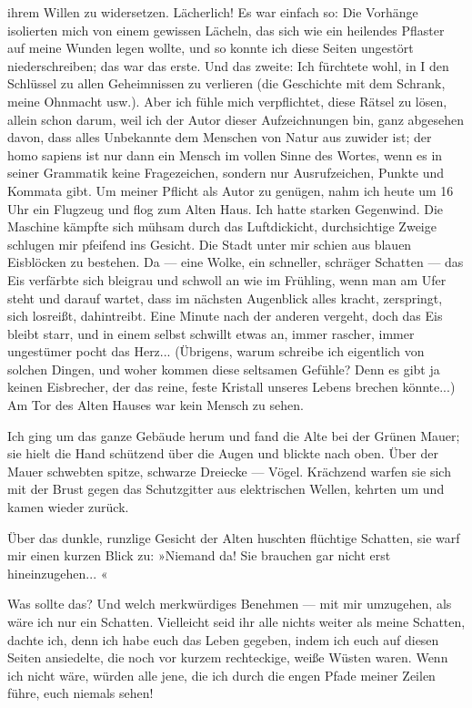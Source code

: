 ihrem Willen zu widersetzen. Lächerlich! Es war einfach so: Die
Vorhänge isolierten mich von einem gewissen Lächeln, das sich wie
ein heilendes Pflaster auf meine Wunden legen wollte, und so konnte
ich diese Seiten ungestört niederschreiben; das war das erste. Und
das zweite: Ich fürchtete wohl, in I den Schlüssel zu allen
Geheimnissen zu verlieren (die Geschichte mit dem Schrank, meine
Ohnmacht usw.). Aber ich fühle mich verpflichtet, diese Rätsel zu
lösen, allein schon darum, weil ich der Autor dieser Aufzeichnungen
bin, ganz abgesehen davon, dass alles Unbekannte dem Menschen von
Natur aus zuwider ist; der homo sapiens ist nur dann ein Mensch im
vollen Sinne des Wortes, wenn es in seiner Grammatik keine
Fragezeichen, sondern nur Ausrufzeichen, Punkte und Kommata gibt.
Um meiner Pflicht als Autor zu genügen, nahm ich heute um 16 Uhr
ein Flugzeug und flog zum Alten Haus. Ich hatte starken Gegenwind.
Die Maschine kämpfte sich mühsam durch das Luftdickicht,
durchsichtige Zweige schlugen mir pfeifend ins Gesicht. Die Stadt
unter mir schien aus blauen Eisblöcken zu bestehen. Da — eine
Wolke, ein schneller, schräger Schatten — das Eis verfärbte sich
bleigrau und schwoll an wie im Frühling, wenn man am Ufer steht und
darauf wartet, dass im nächsten Augenblick alles kracht,
zerspringt, sich losreißt, dahintreibt. Eine Minute nach der
anderen vergeht, doch das Eis bleibt starr, und in einem selbst
schwillt etwas an, immer rascher, immer ungestümer pocht das
Herz... (Übrigens, warum schreibe ich eigentlich von solchen
Dingen, und woher kommen diese seltsamen Gefühle? Denn es gibt ja
keinen Eisbrecher, der das reine, feste Kristall unseres Lebens
brechen könnte...) Am Tor des Alten Hauses war kein Mensch zu
sehen.

Ich ging um das ganze Gebäude herum und fand die Alte bei der
Grünen Mauer; sie hielt die Hand schützend über die Augen und
blickte nach oben. Über der Mauer schwebten spitze, schwarze
Dreiecke — Vögel. Krächzend warfen sie sich mit der Brust gegen das
Schutzgitter aus elektrischen Wellen, kehrten um und kamen wieder
zurück.

Über das dunkle, runzlige Gesicht der Alten huschten flüchtige
Schatten, sie warf mir einen kurzen Blick zu: »Niemand da! Sie
brauchen gar nicht erst hineinzugehen... «

Was sollte das? Und welch merkwürdiges Benehmen — mit mir
umzugehen, als wäre ich nur ein Schatten. Vielleicht seid ihr alle
nichts weiter als meine Schatten, dachte ich, denn ich habe euch
das Leben gegeben, indem ich euch auf diesen Seiten ansiedelte, die
noch vor kurzem rechteckige, weiße Wüsten waren. Wenn ich nicht
wäre, würden alle jene, die ich durch die engen Pfade meiner Zeilen
führe, euch niemals sehen!

